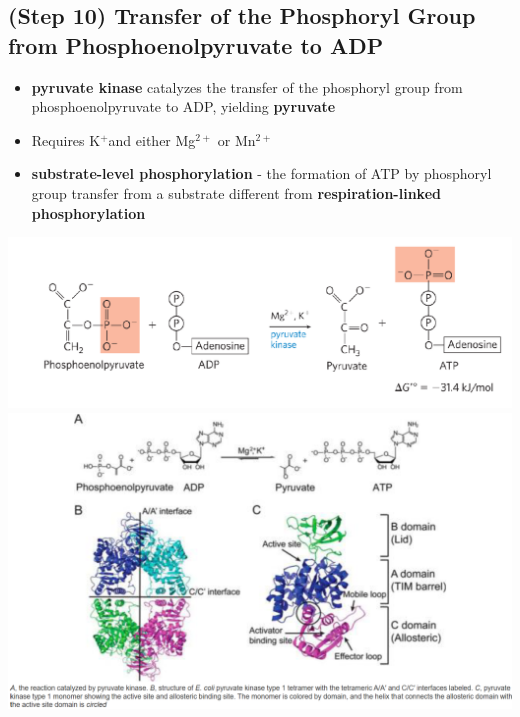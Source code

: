 \documentclass[10pt]{article}
\newcommand{\pc}{$^+$}
\begin{document}
\subsection*{(Step 10) Transfer of the Phosphoryl Group from Phosphoenolpyruvate to ADP}
\begin{itemize}
	\item \textbf{pyruvate kinase} catalyzes the transfer of the phosphoryl group from phosphoenolpyruvate to ADP, yielding \textbf{pyruvate}
	\item Requires K\pc and either Mg$^{2+}$ or Mn$^{2+}$
	\item \textbf{substrate-level phosphorylation} - the formation of ATP by phosphoryl group transfer from a substrate different from \textbf{respiration-linked phosphorylation}
\end{itemize}
\begin{center} 
	\includegraphics*[width=\textwidth]{L1_20.png}\\
    \includegraphics*[width=\textwidth]{L1_21.png}
\end{center}
\end{document}
